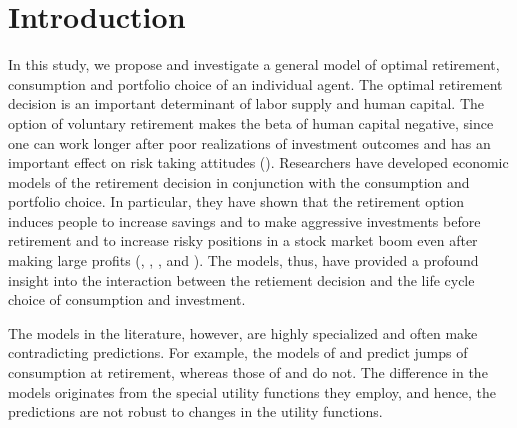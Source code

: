 \documentclass[a4paper,report, 11pt]{article}
\begin{document}
\section{Introduction}


In this study, we propose and investigate a general model of optimal retirement,  consumption and portfolio choice  of an individual agent. The optimal  retirement decision is an important determinant of labor supply and human capital. The option of voluntary retirement  makes  the beta of human capital negative, since one can work longer after poor realizations of investment outcomes and has an important effect on risk taking attitudes (\citet{DL2010}). Researchers have developed economic models of the retirement decision in conjunction with the consumption and portfolio choice. In particular, they have shown that the retirement option induces people to increase savings and to make aggressive investments before retirement and to increase risky positions in a stock market boom even after making large profits (\citet{CS2006}, \citet{FP2007},  \citet{CSS2008}, and \citet{YK}).
The models, thus, have provided a profound insight into the interaction between the retiement decision and the life cycle choice of consumption and investment.

The models in the literature, however, are highly specialized and often make contradicting predictions. For example, the models of \citet{FP2007} and \citet{DL2010} predict jumps of consumption at retirement, whereas those of \citet{CS2006} and \citet{YK} do not. The difference in the models originates from the special utility functions they employ, and hence, the predictions are not robust to changes in the utility functions.
\end{document}
